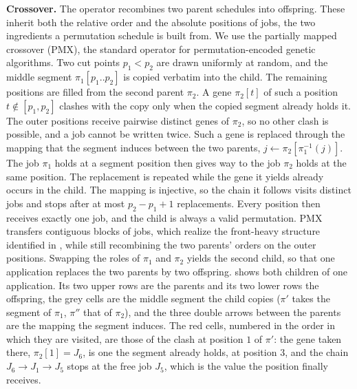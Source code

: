 \documentclass[12pt]{article}
\begin{document}
\begin{sloppypar}
        \textbf{Crossover.} The operator recombines two parent schedules into offspring. These inherit
        both the relative order and the absolute positions of jobs, the two ingredients a permutation
        schedule is built from. We use the partially mapped crossover (PMX), the standard operator for
        permutation-encoded genetic algorithms. Two cut points $p_1<p_2$ are drawn uniformly at
        random, and the middle segment $\pi_1[p_1..p_2]$ is copied verbatim into the child. The
        remaining positions are filled from the second parent $\pi_2$. A gene $\pi_2[t]$ of such a
        position $t\notin[p_1,p_2]$ clashes with the copy only when the copied segment already holds
        it. The outer positions receive pairwise distinct genes of $\pi_2$, so no other clash is
        possible, and a job cannot be written twice. Such a gene is replaced through the mapping that
        the segment induces between the two parents, $j\gets\pi_2[\pi_1^{-1}(j)]$. The job $\pi_1$
        holds at a segment position then gives way to the job $\pi_2$ holds at the same position. The
        replacement is repeated while the gene it yields already occurs in the child. The mapping is
        injective, so the chain it follows visits distinct jobs and stops after at most $p_2-p_1+1$
        replacements. Every position then receives exactly one job, and the child is always a valid
        permutation. PMX transfers contiguous blocks of jobs, which realize the front-heavy structure
        identified in , while still recombining the two parents' orders on the
        outer positions. Swapping the roles of
        $\pi_1$ and $\pi_2$ yields the second child, so that one application replaces the two parents
        by two offspring.  shows both children of one application. Its two upper rows
        are the parents and its two lower rows the offspring, the grey cells are the middle segment the
        child copies ($\pi'$ takes the segment of $\pi_1$, $\pi''$ that of $\pi_2$), and the three
        double arrows between the parents are the mapping the segment induces. The red cells, numbered
        in the order in which they are visited, are those of the clash at position $1$ of $\pi'$: the
        gene taken there, $\pi_2[1]=J_6$, is one the segment already holds, at position $3$, and the
        chain $J_6\to J_1\to J_5$ stops at the free job $J_5$, which is the value the position
        finally receives.
        

\end{sloppypar}
\end{document}
